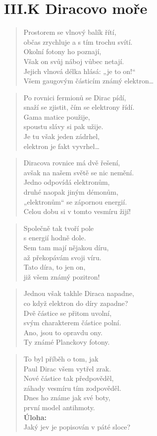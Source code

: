 \documentclass{../../../../style/mkimain}
\begin{document}
\section*{III.K Diracovo moře}
\begin{verse}
Prostorem se vlnový balík řítí,\\
občas zrychluje a s tím trochu svítí.\\
Okolní fotony ho poznají,\\
Však on svůj náboj vůbec netají.\\
Jejich vlnová délka hlásá: „je to on!“\\
Všem gaugovým částicím známý elektron…
\end{verse}
\begin{verse}
Po rovnici fermionů se Dirac pídí,\\
snaží se zjistit, čím se elektrony řídí.\\
Gama matice použije,\\
spoustu slávy si pak užije.\\
Je tu však jeden zádrhel,\\
elektron je fakt vyvrhel…
\end{verse}
\begin{verse}
Diracova rovnice má dvě řešení,\\
avšak na našem světě se nic nemění.\\
Jedno odpovídá elektronům,\\
druhé naopak jiným démonům,\\
„elektronům“ se zápornou energií.\\
Celou dobu si v tomto vesmíru žijí!
\end{verse}
\begin{verse}
Společně tak tvoří pole\\
s energií hodně dole.\\
Sem tam mají nějakou díru,\\
až překopávám svoji víru.\\
Tato díra, to jen on,\\
již všem známý pozitron!
\end{verse}
\begin{verse}
Jednou však takhle Diraca napadne,\\
co když elektron do díry zapadne?\\
Dvě částice se přitom uvolní,\\
svým charakterem částice polní.\\
Ano, jsou to opravdu ony.\\
Ty známé Planckovy fotony.
\end{verse}
\begin{verse}
To byl příběh o tom, jak\\
Paul Dirac všem vytřel zrak.\\
Nové částice tak předpověděl,\\
záhady vesmíru tím zodpověděl.\\
Dnes ho známe jak své boty,\\
první model antihmoty.\\
\vspace{0.5cm}
\textbf{Úloha:}
\\
Jaký jev je popisován v páté sloce?
\end{verse}
\end{document}
